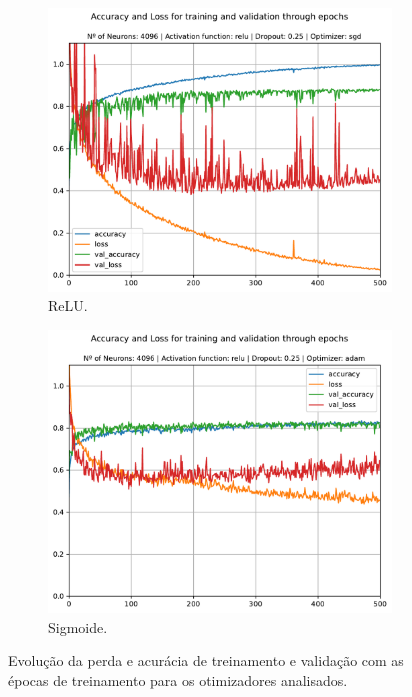 \begin{figure}[H]
	\centering
	\begin{subfigure}[H]{0.49\textwidth}
		\includegraphics[width = \textwidth]{../../plot/mlp/mlp_4096_relu_0.25_sgd}
		\caption{ReLU.}
		\label{fig:mlp_4096_relu_0.0_sgd_opt}
	\end{subfigure}
	\begin{subfigure}[H]{0.49\textwidth}
		\centering
		\includegraphics[width = \textwidth]{../../plot/mlp/mlp_4096_relu_0.25_adam}
		\caption{Sigmoide.}
		\label{fig:mlp_4096_relu_0.25_adam}
	\end{subfigure}
	\caption{Evolução da perda e acurácia de treinamento e validação com as épocas de treinamento para os otimizadores analisados.}
	\label{fig:train_search_opt}
\end{figure}

